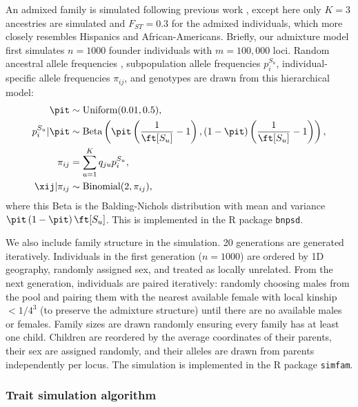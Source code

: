 \documentclass[11pt]{article}
\begin{document}
An admixed family is simulated following previous work \citep{yao_limitations_2022}, except here only $K=3$ ancestries are simulated and $F_{ST}=0.3$ for the admixed individuals, which more closely resembles Hispanics and African-Americans.
Briefly, our admixture model first simulates $n=1000$ founder individuals with $m=100,000$ loci.
Random ancestral allele frequencies \pit, subpopulation allele frequencies $p_i^{S_u}$, individual-specific allele frequencies $\pi_{ij}$, and genotypes \xij are drawn from this hierarchical model:
\begin{align*}
  \pit
  &\sim
    \text{Uniform}( 0.01, 0.5 )
    , \\
  p_i^{S_u} | \pit
  &\sim
    \text{Beta} \left(
    \pit \left( \frac{1}{ \ft[S_u] } - 1 \right),
    \left( 1 - \pit \right) \left( \frac{1}{ \ft[S_u] } - 1 \right)
    \right)
    , \\
  \pi_{ij}
  &=
    \sum_{u = 1}^K q_{ju} p_i^{S_u}
    , \\
  \xij | \pi_{ij}
  &\sim
    \text{Binomial}(2, \pi_{ij})
    ,
\end{align*}
where this Beta is the Balding-Nichols distribution \citep{balding_method_1995} with mean \pit and variance $\pit \left( 1 - \pit \right) \ft[S_u]$.
This is implemented in the R package \texttt{bnpsd}.

We also include family structure in the simulation.
20 generations are generated iteratively.
Individuals in the first generation ($n=1000$) are ordered by 1D geography, randomly assigned sex, and treated as locally unrelated. 
From the next generation, individuals are paired iteratively: randomly choosing males from the pool and pairing them with the nearest available female with local kinship $<1/4^3$ (to preserve the admixture structure) until there are no available males or females.
Family sizes are drawn randomly ensuring every family has at least one child.
Children are reordered by the average coordinates of their parents, their sex are assigned randomly, and their alleles are drawn from parents independently per locus.
The simulation is implemented in the R package \texttt{simfam}.

\subsubsection{Trait simulation algorithm}
\end{document}
